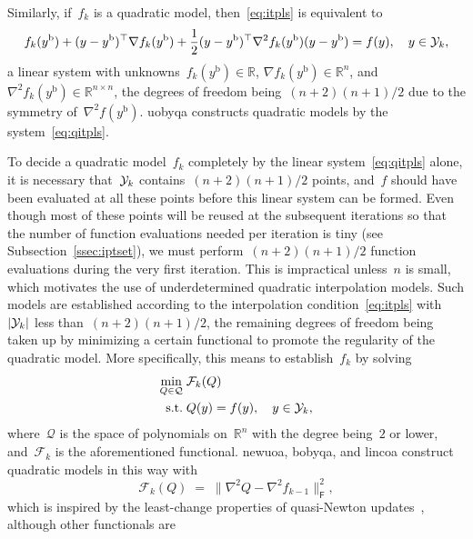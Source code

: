 \documentclass[11pt,draft]{article}
\numberwithin{equation}{section}
\newcommand{\R}{\mathbb{R}}
\newcommand{\base}{{\text{b}}}
\newcommand{\frob}{\mathsf{F}}
\newcommand{\func}{\mathcal{F}}
\newcommand{\qspace}{\mathcal{Q}}
\newcommand{\st}{\text{s.t.}}
\newcommand{\xpt}[1][k]{\mathcal{Y}\ifthenelse{\equal{#1}{}}{}{_{#1}}}
\begin{document}
Similarly, if~$f_k$ is a quadratic model, then~\eqref{eq:itpls} is equivalent to
\begin{equation}
    \label{eq:qitpls}
    f_k(y^{\base}) + (y -y^{\base})^\top \nabla f_k(y^{\base})
    + \frac{1}{2}(y-y^{\base})^\top  \nabla^2 f_k(y^{\base}) (y-y^{\base}) = f(y),  \quad y \in \xpt,
\end{equation}
a linear system with unknowns~$f_k(y^\base) \in \R$, $\nabla f_k(y^\base) \in \R^n$, and~$\nabla^2
f_k(y^{\base})\in\R^{n\times n}$, the degrees of freedom being~$(n+2)(n+1)/2$
due to the symmetry of~$\nabla^2 f(y^\base)$. \gls{uobyqa} constructs quadratic models by the
system~\eqref{eq:qitpls}.

To decide a quadratic model~$f_k$ completely by the linear system~\eqref{eq:qitpls} alone, it
is necessary that~$\xpt$ contains~$(n+2)(n+1)/2$ points, and~$f$ should have been evaluated at all
these points before this linear system can be formed. Even though most of these points will be
reused at the subsequent iterations so that the number of function evaluations needed per iteration
is tiny (see Subsection~\ref{ssec:iptset}), we must perform~$(n+2)(n+1)/2$ function evaluations
during the very first iteration. This is impractical unless~$n$ is small, which motivates the use of
underdetermined quadratic interpolation models. Such models are established according to the
interpolation condition~\eqref{eq:itpls} with~$|\xpt|$ less than~$(n+2)(n+1)/2$, the
remaining degrees of freedom being taken up by minimizing a certain functional to promote the regularity
of the quadratic model. More specifically, this means to establish~$f_k$ by solving
\begin{equation}
    \label{eq:undqitp}
    \begin{split}
    \min_{Q \in \qspace}\; & \func_k(Q) \\
    \st \; & Q(y) = f(y), \quad y \in \xpt,
    \end{split}
\end{equation}
where~$\qspace$ is the space of polynomials on~$\R^n$ with the degree being~$2$ or lower,
and~$\func_k$ is the aforementioned functional. \gls{newuoa}, \gls{bobyqa}, and
\gls{lincoa} construct quadratic models in this way with
\begin{equation}
    \label{eq:leastchange}
    \func_k(Q) \;=\; \|\nabla^2 Q - \nabla^2 f_{k-1}\|_\frob^2,
\end{equation}
which is inspired by the least-change properties of quasi-Newton
updates~\cite{Dennis_Schnabel_1979}, although other functionals are
\end{document}

